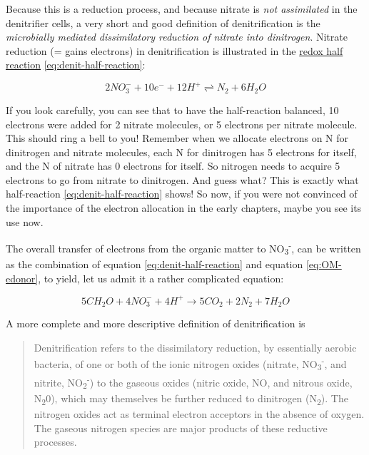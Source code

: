 \documentclass[]{book}
\theoremstyle{definition}
\theoremstyle{definition}
\theoremstyle{definition}
\theoremstyle{remark}
\begin{document}
Because this is a reduction process, and because nitrate is \emph{not
assimilated} in the denitrifier cells, a very short and good definition
of denitrification is the \emph{microbially mediated dissimilatory
reduction of nitrate into dinitrogen}. Nitrate reduction (= gains
electrons) in denitrification is illustrated in the
\protect\hyperlink{redox}{redox half reaction}
\eqref{eq:denit-half-reaction}:

\begin{equation}
2 NO_3^- + 10 e^- + 12 H^+ \rightleftharpoons N_2 + 6 H_2O
\label{eq:denit-half-reaction}
\end{equation}

If you look carefully, you can see that to have the half-reaction
balanced, 10 electrons were added for 2 nitrate molecules, or 5
electrons per nitrate molecule. This should ring a bell to you! Remember
when we allocate electrons on N for dinitrogen and nitrate molecules,
each N for dinitrogen has 5 electrons for itself, and the N of nitrate
has 0 electrons for itself. So nitrogen needs to acquire 5 electrons to
go from nitrate to dinitrogen. And guess what? This is exactly what
half-reaction \eqref{eq:denit-half-reaction} shows! So now, if you were
not convinced of the importance of the electron allocation in the early
chapters, maybe you see its use now.

The overall transfer of electrons from the organic matter to
NO\textsubscript{3}\textsuperscript{-}, can be written as the
combination of equation \eqref{eq:denit-half-reaction} and equation
\eqref{eq:OM-edonor}, to yield, let us admit it a rather complicated
equation:

\begin{equation}
5 CH_2O + 4 NO_3^- + 4 H^+ \rightarrow 5 CO_2 + 2 N_2 + 7 H_2O
\label{eq:denit-reduc}
\end{equation}

A more complete and more descriptive definition of denitrification is

\begin{quote}
Denitrification refers to the dissimilatory reduction, by essentially
aerobic bacteria, of one or both of the ionic nitrogen oxides (nitrate,
NO\textsubscript{3}\textsuperscript{-}, and nitrite,
NO\textsubscript{2}\textsuperscript{-}) to the gaseous oxides (nitric
oxide, NO, and nitrous oxide, N\textsubscript{2}0), which may themselves
be further reduced to dinitrogen (N\textsubscript{2}). The nitrogen
oxides act as terminal electron acceptors in the absence of oxygen. The
gaseous nitrogen species are major products of these reductive
processes. \citep{Knowles1982-ku}
\end{quote}
\end{document}
